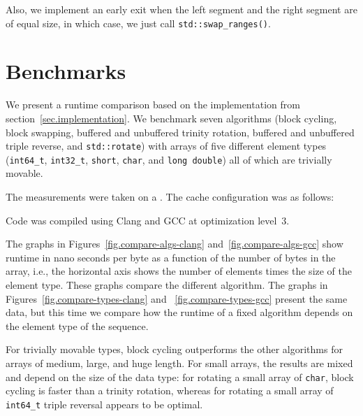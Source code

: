   Also, we implement an early exit when the left segment
  and the right segment are of equal size, in which case, we just call
  \verb+std::swap_ranges()+.

  


  
  
  

  \newpage
  \appendix
  \section{Benchmarks}\label{sec.benchmarks}
  We present a runtime comparison based on the implementation from
  section~\ref{sec.implementation}.  We benchmark seven algorithms
  (block cycling, block swapping, buffered and unbuffered trinity
  rotation, buffered and unbuffered triple reverse, and
  \verb+std::rotate+) with arrays of five different element types
  (\verb+int64_t+, \verb+int32_t+, \verb+short+, \verb+char+, and
  \verb+long double+) all of which are trivially movable.
  
  The measurements were taken on a \unskip.
  The cache configuration was as follows:
  \begin{center}
    {\fontsize{9}{12}\selectfont}
  \end{center}
  Code was compiled using Clang and {\small GCC} at optimization level~3.
 
  The graphs in Figures~\ref{fig.compare-algs-clang}
  and~\ref{fig.compare-algs-gcc} show runtime in
  nano seconds per byte as a function of the number of bytes in the
  array, i.e., the horizontal axis shows the number of elements times
  the size of the element type. These graphs compare the different
  algorithm.  The graphs in Figures~\ref{fig.compare-types-clang}
  and ~\ref{fig.compare-types-gcc}
  present the same data, but this time we compare how the runtime of a
  fixed algorithm depends on the element type of the sequence.

  For trivially movable types, block cycling outperforms the other
  algorithms for arrays of medium, large, and huge length. For small
  arrays, the results are mixed and depend on the size of the data
  type: for rotating a small array of \verb+char+, block cycling is
  faster than a trinity rotation, whereas for rotating a small array of
  \verb+int64_t+ triple reversal appears to be optimal.
  
